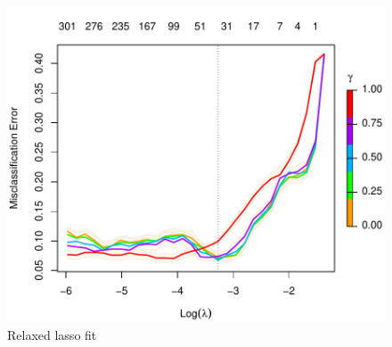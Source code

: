 \documentclass[
]{book}
\begin{document}
\begin{figure}
\centering
\includegraphics{Static/figures/lookLassoR-1.pdf}
\caption{\label{fig:lookLassoR}Relaxed lasso fit}
\end{figure}
\end{document}

